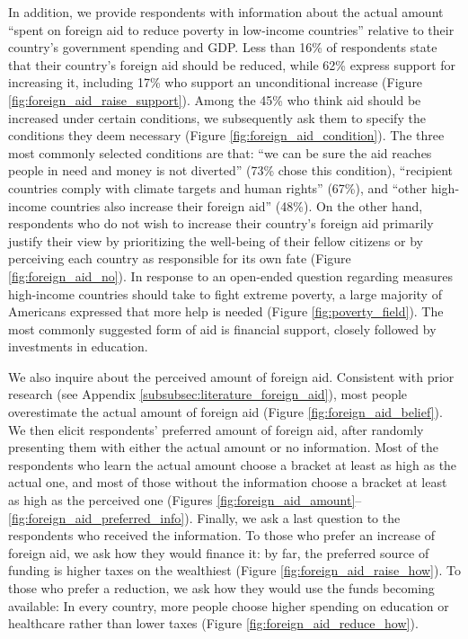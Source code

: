 \begin{bibunit}
In addition, we provide respondents with information about the actual amount ``spent on foreign aid to reduce poverty in low-income countries'' relative to their country's government spending and GDP. Less than 16\% of respondents state that their country's foreign aid should be reduced, while 62\% express support for increasing it, including 17\% who support an unconditional increase (Figure \ref{fig:foreign_aid_raise_support}). Among the 45\% who think aid should be increased under certain conditions, we subsequently ask them to specify the conditions they deem necessary (Figure \ref{fig:foreign_aid_condition}). The three most commonly selected conditions are that: ``we can be sure the aid reaches people in need and money is not diverted'' (73\% chose this condition), ``recipient countries comply with climate targets and human rights'' (67\%), and ``other high-income countries also increase their foreign aid'' (48\%). %
On the other hand, respondents who do not wish to increase their country's foreign aid primarily justify their view by prioritizing the well-being of their fellow citizens or by perceiving each country as responsible for its own fate (Figure \ref{fig:foreign_aid_no}). In response to an open-ended question regarding measures high-income countries should take to fight extreme poverty, a large majority of Americans expressed that more help is needed (Figure \ref{fig:poverty_field}). The most commonly suggested form of aid is financial support, closely followed by investments in education. 

We also inquire about the perceived amount of foreign aid. Consistent with prior research (see Appendix \ref{subsubsec:literature_foreign_aid}), most people overestimate the actual amount of foreign aid (Figure \ref{fig:foreign_aid_belief}). We then elicit respondents' preferred amount of foreign aid, after randomly presenting them with either the actual amount or no information. Most of the respondents who learn the actual amount choose a bracket at least as high as the actual one, and most of those without the information choose a bracket at least as high as the perceived one (Figures \ref{fig:foreign_aid_amount}--\ref{fig:foreign_aid_preferred_info}). Finally, we ask a last question to the respondents who received the information. To those who prefer an increase of foreign aid, we ask how they would finance it: by far, the preferred source of funding is higher taxes on the wealthiest (Figure \ref{fig:foreign_aid_raise_how}). To those who prefer a reduction, we ask how they would use the funds becoming available: %
In every country, more people choose higher spending on education or healthcare rather than lower taxes (Figure \ref{fig:foreign_aid_reduce_how}). 



\end{bibunit}
